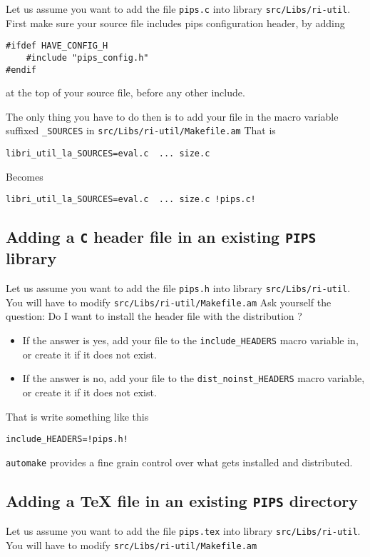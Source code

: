 \documentclass[a4paper]{article}
\newcommand{\PIPS}{\textbf{\texttt{PIPS}}}
\newcommand{\automake}{\texttt{automake}}
\newcommand{\file}[1]{\texttt{#1}}
\newcommand{\dir}[1]{\texttt{#1}}
\begin{document}
Let us assume you want to add the file \file{pips.c} into library \dir{src/Libs/ri-util}.
First make sure your source file includes pips configuration header, by adding 

\begin{lstlisting}
#ifdef HAVE_CONFIG_H
    #include "pips_config.h"
#endif
\end{lstlisting}

at the top of your source file, before any other include.


The only thing you have to do then is to add your file in the macro variable suffixed \texttt{\_SOURCES}
in \file{src/Libs/ri-util/Makefile.am}
That is
\begin{lstlisting}
libri_util_la_SOURCES=eval.c  ... size.c
\end{lstlisting}
Becomes
\begin{lstlisting}
libri_util_la_SOURCES=eval.c  ... size.c !pips.c!
\end{lstlisting}

\subsection{Adding a \texttt{C} header file in an existing \PIPS{} library}

Let us assume you want to add the file \file{pips.h} into library \dir{src/Libs/ri-util}.
You will have to modify \file{src/Libs/ri-util/Makefile.am}
Ask yourself the question: Do I want to install the header file with the distribution ?
\begin{itemize}
\item If the answer is yes, add your file to the \texttt{include\_HEADERS} macro variable in, or create it if it does not exist.
\item If the answer is no, add your file to the \texttt{dist\_noinst\_HEADERS}  macro variable, or create it if it does not exist.
\end{itemize}
That is write something like this
\begin{lstlisting}
include_HEADERS=!pips.h!
\end{lstlisting}

\automake{} provides a fine grain control over what gets installed and distributed.


\subsection{Adding a \TeX{} file in an existing \PIPS{} directory}
Let us assume you want to add the file \file{pips.tex} into library \dir{src/Libs/ri-util}.
You will have to modify \file{src/Libs/ri-util/Makefile.am}
\end{document}
